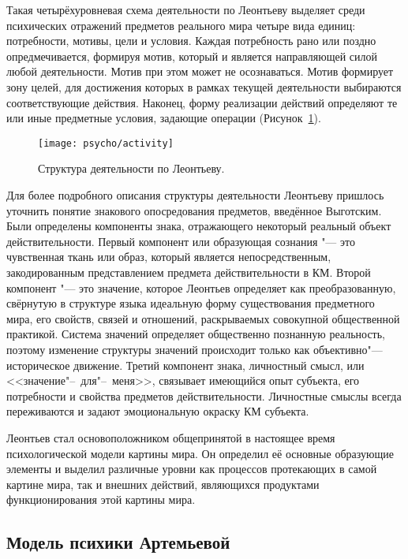 Такая четырёхуровневая схема деятельности по Леонтьеву выделяет среди психических отражений предметов реального мира четыре вида единиц: потребности, мотивы, цели и условия. Каждая потребность рано или поздно опредмечивается, формируя мотив, который и является направляющей силой любой деятельности. Мотив при этом может не осознаваться. Мотив формирует зону целей, для достижения которых в рамках текущей деятельности выбираются соответствующие действия. Наконец, форму реализации действий определяют те или иные предметные условия, задающие операции (Рисунок~\ref{fg:activity}).

\begin{figure}[h]
	\centering	
	\texttt{[image: psycho/activity]}
	\caption{Структура деятельности по Леонтьеву.}
	\label{fg:activity}
\end{figure}

Для более подробного описания структуры деятельности Леонтьеву пришлось уточнить понятие знакового опосредования предметов, введённое Выготским. Были определены компоненты знака, отражающего некоторый реальный объект действительности. Первый компонент или образующая сознания "--- это чувственная ткань или образ, который является непосредственным, закодированным представлением предмета действительности в КМ. Второй компонент "--- это значение, которое Леонтьев определяет как преобразованную, свёрнутую в структуре языка идеальную форму существования предметного мира, его свойств, связей и отношений, раскрываемых совокупной общественной практикой. Система значений определяет общественно познанную реальность, поэтому изменение структуры значений происходит только как объективно"---историческое движение. Третий компонент знака, личностный смысл, или <<значение"--~для"--~меня>>, связывает имеющийся опыт субъекта, его потребности и свойства предметов действительности. Личностные смыслы всегда переживаются и задают эмоциональную окраску КМ субъекта.

Леонтьев стал основоположником общепринятой в настоящее время психологической модели картины мира. Он определил её основные образующие элементы и выделил различные уровни как процессов протекающих в самой картине мира, так и внешних действий, являющихся продуктами функционирования этой картины мира.

\subsection{Модель психики Артемьевой}

